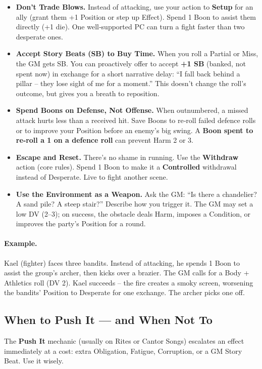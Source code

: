 \begin{itemize}
  \item \textbf{Don’t Trade Blows.} Instead of attacking, use your action to \textbf{Setup} for an ally (grant them +1 Position or step up Effect). Spend 1 Boon to assist them directly (+1 die). One well‑supported PC can turn a fight faster than two desperate ones.
  \item \textbf{Accept Story Beats (SB) to Buy Time.} When you roll a Partial or Miss, the GM gets SB. You can proactively offer to accept \textbf{+1 SB} (banked, not spent now) in exchange for a short narrative delay: “I fall back behind a pillar – they lose sight of me for a moment.” This doesn’t change the roll’s outcome, but gives you a breath to reposition.
  \item \textbf{Spend Boons on Defense, Not Offense.} When outnumbered, a missed attack hurts less than a received hit. Save Boons to re‑roll failed defence rolls or to improve your Position before an enemy’s big swing. A \textbf{Boon spent to re‑roll a 1 on a defence roll} can prevent Harm 2 or 3.
  \item \textbf{Escape and Reset.} There’s no shame in running. Use the \textbf{Withdraw} action (core rules). Spend 1 Boon to make it a \textbf{Controlled} withdrawal instead of Desperate. Live to fight another scene.
  \item \textbf{Use the Environment as a Weapon.} Ask the GM: “Is there a chandelier? A sand pile? A steep stair?” Describe how you trigger it. The GM may set a low DV (2–3); on success, the obstacle deals Harm, imposes a Condition, or improves the party’s Position for a round.
\end{itemize}

\paragraph{Example.}
Kael (fighter) faces three bandits. Instead of attacking, he spends 1 Boon to assist the group’s archer, then kicks over a brazier. The GM calls for a Body + Athletics roll (DV 2). Kael succeeds – the fire creates a smoky screen, worsening the bandits’ Position to Desperate for one exchange. The archer picks one off.

\subsection{When to Push It — and When Not To}

The \textbf{Push It} mechanic (usually on Rites or Cantor Songs) escalates an effect immediately at a cost: extra Obligation, Fatigue, Corruption, or a GM Story Beat. Use it wisely.

